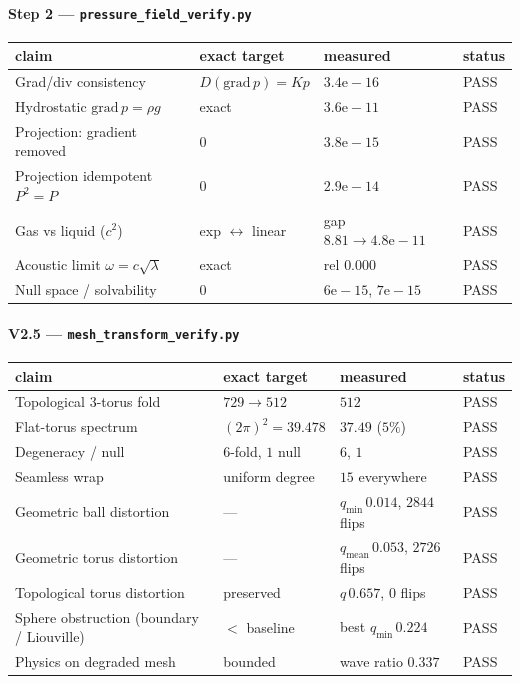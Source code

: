 \documentclass[11pt]{article}
\newcommand{\code}[1]{\texttt{#1}}
\begin{document}
\paragraph{Step 2 --- \code{pressure\_field\_verify.py}}
\begin{longtable}{@{}p{5.6cm}p{3.2cm}p{3.4cm}l@{}}
\toprule
claim & exact target & measured & status \\ \midrule \endhead
Grad/div consistency & $D(\mathrm{grad}\,p)=Kp$ & $3.4\mathrm{e}{-}16$ & PASS \\
Hydrostatic $\mathrm{grad}\,p=\rho g$ & exact & $3.6\mathrm{e}{-}11$ & PASS \\
Projection: gradient removed & $0$ & $3.8\mathrm{e}{-}15$ & PASS \\
Projection idempotent $P^2{=}P$ & $0$ & $2.9\mathrm{e}{-}14$ & PASS \\
Gas vs liquid ($c^2$) & exp $\leftrightarrow$ linear & gap $8.81 \to 4.8\mathrm{e}{-}11$ & PASS \\
Acoustic limit $\omega=c\sqrt{\lambda}$ & exact & rel $0.000$ & PASS \\
Null space / solvability & $0$ & $6\mathrm{e}{-}15$, $7\mathrm{e}{-}15$ & PASS \\
\bottomrule
\end{longtable}

\paragraph{V2.5 --- \code{mesh\_transform\_verify.py}}
\begin{longtable}{@{}p{5.6cm}p{3.2cm}p{3.4cm}l@{}}
\toprule
claim & exact target & measured & status \\ \midrule \endhead
Topological 3-torus fold & $729 \to 512$ & $512$ & PASS \\
Flat-torus spectrum & $(2\pi)^2 = 39.478$ & $37.49$ ($5\%$) & PASS \\
Degeneracy / null & 6-fold, $1$ null & $6$, $1$ & PASS \\
Seamless wrap & uniform degree & $15$ everywhere & PASS \\
Geometric ball distortion & --- & $q_{\min}\,0.014$, $2844$ flips & PASS \\
Geometric torus distortion & --- & $q_{\text{mean}}\,0.053$, $2726$ flips & PASS \\
Topological torus distortion & preserved & $q\,0.657$, $0$ flips & PASS \\
Sphere obstruction (boundary / Liouville) & $<$ baseline & best $q_{\min}\,0.224$ & PASS \\
Physics on degraded mesh & bounded & wave ratio $0.337$ & PASS \\
\bottomrule
\end{longtable}
\end{document}
